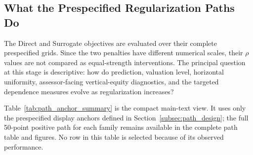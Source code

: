 \documentclass[10pt]{article}
\theoremstyle{definition}
\newcommand{\1}{\mathbf{1}}
\newcommand{\oldtext}[1]{\textcolor{blue}{\sout{#1}}}
\newcommand{\newtext}[1]{\textcolor{impGreen}{#1}}
\begin{document}
\subsection{What the Prespecified Regularization Paths Do}
\label{subsec:path_results}

\newtext{The Direct and Surrogate objectives are evaluated over their complete}
prespecified grids. Since the two penalties have different numerical scales, their
$\rho$ values are not compared as equal-strength interventions. The principal
question at this stage is descriptive: how do prediction, valuation level,
horizontal uniformity, assessor-facing vertical-equity diagnostics, and the targeted
dependence measures evolve as regularization increases?

Table~\ref{tab:path_anchor_summary} is the compact main-text view. It uses only the
prespecified display anchors defined in Section~\ref{subsec:path_design}; the full
50-point positive path for each family remains available in the complete path table
and figures. No row in this table is selected because of its observed performance.
\end{document}

